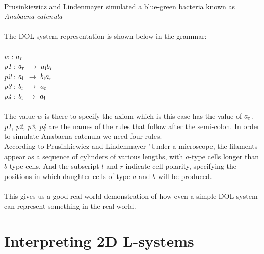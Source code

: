\\
Prusinkiewicz and Lindenmayer simulated a blue-green bacteria known as \textit{Anabaena catenula} \cite{prusinkiewicz2012algorithmic}\\
\\

The DOL-system representation is shown below in the grammar: \\
\\
$w$ : $ a\textsubscript{r} $\\
\textit{p1} : $ a\textsubscript{r} $ $\rightarrow$ $a\textsubscript{l}b\textsubscript{r}$ \\
\textit{p2} : $ a\textsubscript{l} $ $\rightarrow$ $b\textsubscript{l}a\textsubscript{r}$ \\
\textit{p3} : $ b\textsubscript{r} $ $\rightarrow$ $a\textsubscript{r}$ \\
\textit{p4} : $ b\textsubscript{l} $ $\rightarrow$ $a\textsubscript{l}$ \\
\\
The value $w$ is there to specify the axiom which is this case has the value of $ a\textsubscript{r} $. \textit{p1}, \textit{p2}, \textit{p3}, \textit{p4} are the names of the rules that follow after the semi-colon. In order to simulate Anabaena catenula we need four rules. \\
According to Prusinkiewicz and Lindenmayer "Under a microscope, the filaments appear as a sequence of cylinders of various lengths, with $a$-type cells longer than $b$-type cells. And the subscript $l$ and $r$ indicate cell polarity, specifying the positions in which daughter cells of type $a$ and $b$ will be produced. \cite{prusinkiewicz2012algorithmic} \\
\\ 
This gives us a good real world demonstration of how even a simple DOL-system can represent something in the real world. 


\section{Interpreting 2D L-systems} \label{interpreting 2D l-systems}

